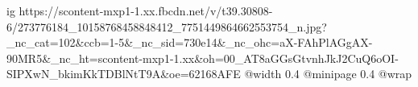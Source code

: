  
 
 
 
 

\ifcmt
  ig https://scontent-mxp1-1.xx.fbcdn.net/v/t39.30808-6/273776184_10158768458848412_7751449864662553754_n.jpg?_nc_cat=102&ccb=1-5&_nc_sid=730e14&_nc_ohc=aX-FAhPlAGgAX-90MR5&_nc_ht=scontent-mxp1-1.xx&oh=00_AT8aGGsGtvnhJkJ2CuQ6oOI-SIPXwN_bkimKkTDBlNtT9A&oe=62168AFE
  @width 0.4
  @minipage 0.4
  @wrap \parpic[r]
\fi
